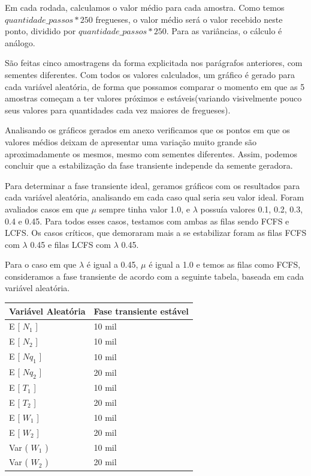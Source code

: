 \documentclass[a4paper,10pt]{article}
\begin{document}
    Em cada rodada, calculamos o valor médio para cada amostra. Como temos $quantidade\_passos * 250$ fregueses, o valor médio será o valor recebido neste ponto, dividido por $quantidade\_passos * 250$. Para as variâncias, o cálculo é análogo.

    São feitas cinco amostragens da forma explicitada nos parágrafos anteriores, com sementes diferentes. Com todos os valores calculados, um gráfico é gerado para cada variável aleatória, de forma que possamos comparar o momento em que as 5 amostras começam a ter valores próximos e estáveis(variando visivelmente pouco seus valores para quantidades cada vez maiores de fregueses).

    Analisando os gráficos gerados em anexo verificamos que os pontos em que os valores médios deixam de apresentar uma variação muito grande são aproximadamente os mesmos, mesmo com sementes diferentes. Assim, podemos concluir que a estabilização da fase transiente independe da semente geradora.

    Para determinar a fase transiente ideal, geramos gráficos com os resultados para cada variável aleatória, analisando em cada caso qual seria seu valor ideal. Foram avaliados casos em que $\mu$ sempre tinha valor 1.0, e $\lambda$ possuía valores 0.1, 0.2, 0.3, 0.4 e 0.45. Para todos esses casos, testamos com ambas as filas sendo FCFS e LCFS. Os casos críticos, que demoraram mais a se estabilizar foram as filas FCFS com $\lambda$ 0.45 e filas LCFS com $\lambda$ 0.45.

    Para o caso em que $\lambda$ é igual a 0.45, $\mu$ é igual a 1.0 e temos as filas como FCFS, consideramos a fase transiente de acordo com a seguinte tabela, baseada em cada variável aleatória.

\begin{center}
\begin{tabular} { | l | l | }
    \hline
    Variável Aleatória  & Fase transiente estável \\ \hline
    E [ $N_1$ ]         & 10 mil \\ \hline
    E [ $N_2$ ]         & 10 mil \\ \hline
    E [ $Nq_1$ ]        & 10 mil \\ \hline
    E [ $Nq_2$ ]	    & 20 mil \\ \hline
    E [ $T_1$ ]         & 10 mil \\ \hline
    E [ $T_2$ ]         & 20 mil \\ \hline
    E [ $W_1$ ]         & 10 mil \\ \hline
    E [ $W_2$ ]         & 20 mil \\ \hline
    Var ( $W_1$ )       & 10 mil \\ \hline
    Var ( $W_2$ )       & 20 mil \\ \hline
\end{tabular}
\end{center}
\end{document}
